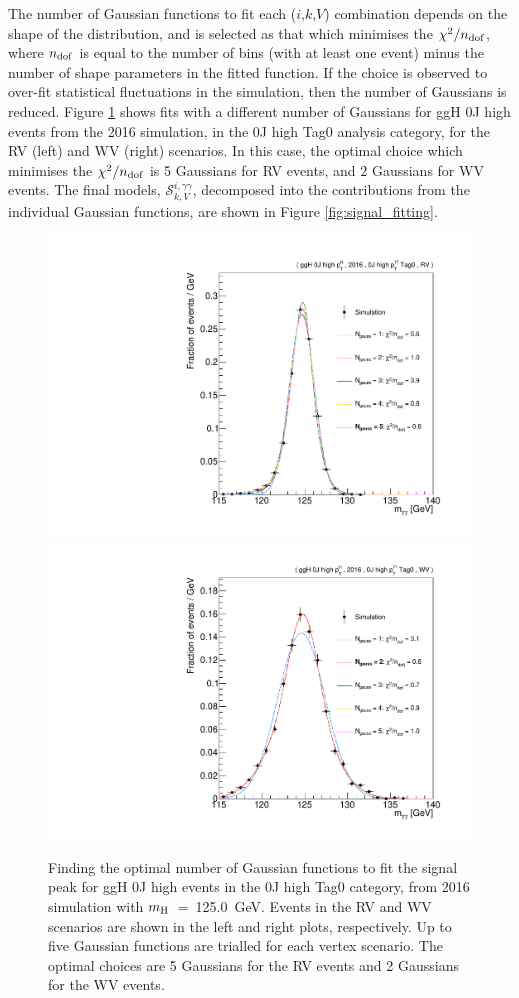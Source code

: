 The number of Gaussian functions to fit each ($i$,$k$,$V$) combination depends on the shape of the \mgg distribution, and is selected as that which minimises the $\chi^2/n_{\rm{dof}}$, where $n_{\rm{dof}}$ is equal to the number of \mgg bins (with at least one event) minus the number of shape parameters in the fitted function. If the choice is observed to over-fit statistical fluctuations in the simulation, then the number of Gaussians is reduced. Figure \ref{fig:sigmodels_ftest} shows fits with a different number of Gaussians for ggH 0J high \ptH events from the 2016 simulation, in the 0J high \ptgg Tag0 analysis category, for the RV (left) and WV (right) scenarios. In this case, the optimal choice which minimises the $\chi^2/n_{\rm{dof}}$ is 5 Gaussians for RV events, and 2 Gaussians for WV events. The final models, $\mathcal{S}^{i,\gamma\gamma}_{k,V}$, decomposed into the contributions from the individual Gaussian functions, are shown in Figure \ref{fig:signal_fitting}. 

\begin{figure}
  \centering
  \includegraphics[width=.49\textwidth]{Figures/hgg_stats/fTest_RECO_0J_PTH_GT10_Tag0_GG2H_0J_PTH_GT10_RV.pdf}
  \hfill
  \includegraphics[width=.49\textwidth]{Figures/hgg_stats/fTest_RECO_0J_PTH_GT10_Tag0_GG2H_0J_PTH_GT10_WV.pdf}
  \caption[Signal modelling: number of Gaussians]
  {
    Finding the optimal number of Gaussian functions to fit the signal peak for ggH 0J high \ptH events in the 0J high \ptgg Tag0 category, from 2016 simulation with $m_{\rm{H}}$~=~125.0~GeV. Events in the RV and WV scenarios are shown in the left and right plots, respectively. Up to five Gaussian functions are trialled for each vertex scenario. The optimal choices are 5 Gaussians for the RV events and 2 Gaussians for the WV events.
  }
  \label{fig:sigmodels_ftest}
\end{figure}

